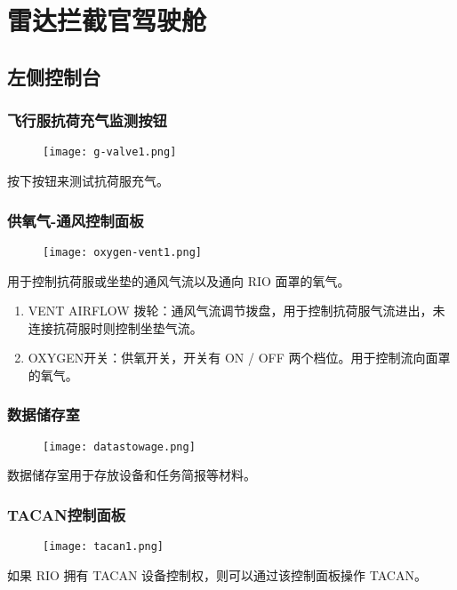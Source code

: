 \section{雷达拦截官驾驶舱}

\subsection{左侧控制台}

\subsubsection{飞行服抗荷充气监测按钮}
\begin{figure}[htb]
	\centering
	\texttt{[image: g-valve1.png]}
\end{figure}
按下按钮来测试抗荷服充气。

\subsubsection{供氧气-通风控制面板}
\begin{figure}[htb]
	\centering
	\texttt{[image: oxygen-vent1.png]}
\end{figure}
用于控制抗荷服或坐垫的通风气流以及通向 RIO 面罩的氧气。

\begin{enumerate}
	\item VENT AIRFLOW 拨轮：通风气流调节拨盘，用于控制抗荷服气流进出，未连接抗荷服时则控制坐垫气流。
	\item OXYGEN开关：供氧开关，开关有 ON / OFF 两个档位。用于控制流向面罩的氧气。
\end{enumerate}

\subsubsection{数据储存室}
\begin{figure}[htb]
	\centering
	\texttt{[image: datastowage.png]}
\end{figure}
数据储存室用于存放设备和任务简报等材料。

\subsubsection{TACAN控制面板}
\begin{figure}[htb]
	\centering
	\texttt{[image: tacan1.png]}
\end{figure}
如果 RIO 拥有 TACAN 设备控制权，则可以通过该控制面板操作 TACAN。

